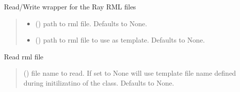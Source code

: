 \documentclass[letterpaper,10pt,english]{sphinxmanual}
\begin{document}
\begin{fulllineitems}
\label{\detokenize{API:raypyng.rml.RMLFile}}
\pysigstartsignatures
{}
\pysigstopsignatures
\sphinxAtStartPar
Read/Write wrapper for the Ray RML files
\begin{quote}\begin{description}
\begin{itemize}
\item {} 
\sphinxAtStartPar
{} (\sphinxstyleliteralemphasis{\sphinxupquote{, }}) \textendash{} path to rml file. Defaults to None.

\item {} 
\sphinxAtStartPar
{} (\sphinxstyleliteralemphasis{\sphinxupquote{, }}) \textendash{} path to rml file to use as template.
Defaults to None.

\end{itemize}

\end{description}\end{quote}

\begin{fulllineitems}
\label{\detokenize{API:raypyng.rml.RMLFile.read}}
\pysigstartsignatures
{}
\pysigstopsignatures
\sphinxAtStartPar
Read rml file
\begin{quote}\begin{description}
\sphinxAtStartPar
{} (\sphinxstyleliteralemphasis{\sphinxupquote{, }}) \textendash{} file name to read. If set to None will use template file name defined during initilizatino of the class. Defaults to None.


\end{description}
\end{quote}
\end{fulllineitems}
\end{fulllineitems}
\end{document}
